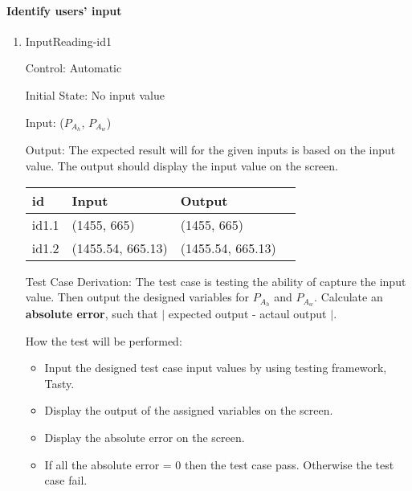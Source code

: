 \documentclass[12pt, titlepage]{article}
\begin{document}
\paragraph{Identify users' input}
\begin{enumerate}

\item{InputReading-id1\\}

Control: Automatic
					
Initial State: No input value
					
Input: ($P_{A_{h}}$, $P_{A_{w}}$)


Output: The expected result will for the given inputs is based on the input value.
The output should display the input value on the screen.


\noindent \begin{tabular}{l l l l} 
    \toprule		
    \textbf{id} & \textbf{Input} & \textbf{Output}\\ 
	\midrule
   id1.1 &  (1455, 665)  & (1455, 665)\\
   id1.2 &  (1455.54, 665.13) & (1455.54, 665.13)\\
    \bottomrule
  \end{tabular}


Test Case Derivation: The test case is testing the ability of capture the input value. Then output the designed variables for  $P_{A_{h}}$ and $P_{A_{w}}$. Calculate an \textbf{absolute error}, such that $|$ expected output - actaul output $|$.

How the test will be performed:

\begin{itemize} 
\item Input the designed test case input values by using testing framework, Tasty. 
\item Display the output of the assigned variables on the screen.
\item  Display the absolute error on the screen.
\item  If all the absolute error = 0 then the test case pass. Otherwise the test case fail.
\end{itemize}

 
  

\end{enumerate}
\end{document}
